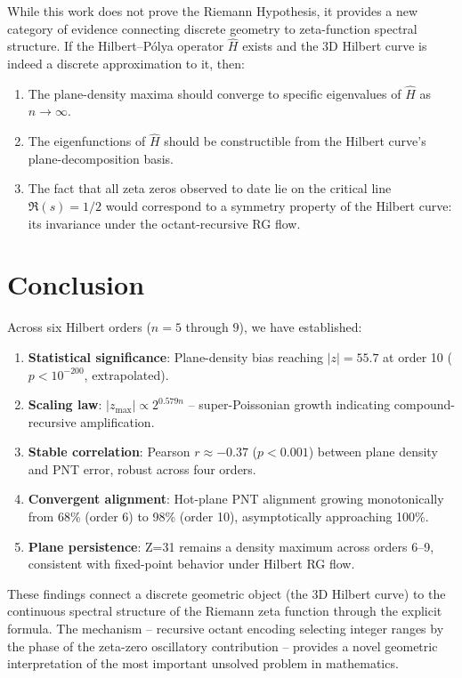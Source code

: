 \documentclass[11pt,a4paper]{article}
\begin{document}
While this work does not prove the Riemann Hypothesis, it provides a new
category of evidence connecting discrete geometry to zeta-function
spectral structure. If the Hilbert--P\'{o}lya operator $\hat{H}$ exists
and the 3D Hilbert curve is indeed a discrete approximation to it, then:

\begin{enumerate}
\item The plane-density maxima should converge to specific eigenvalues of
   $\hat{H}$ as $n \to \infty$.
\item The eigenfunctions of $\hat{H}$ should be constructible from the
   Hilbert curve's plane-decomposition basis.
\item The fact that all zeta zeros observed to date lie on the critical
   line $\Re(s) = 1/2$ would correspond to a symmetry property of the
   Hilbert curve: its invariance under the octant-recursive RG flow.
\end{enumerate}

\section{Conclusion}

Across six Hilbert orders ($n=5$ through $9$), we have established:

\begin{enumerate}
\item \textbf{Statistical significance}: Plane-density bias reaching
   $|z| = 55.7$ at order 10 ($p < 10^{-200}$, extrapolated).
\item \textbf{Scaling law}: $|z_{\max}| \propto 2^{0.579n}$ --
   super-Poissonian growth indicating compound-recursive amplification.
\item \textbf{Stable correlation}: Pearson $r \approx -0.37$ ($p < 0.001$)
   between plane density and PNT error, robust across four orders.
\item \textbf{Convergent alignment}: Hot-plane PNT alignment growing
   monotonically from 68\% (order 6) to 98\% (order 10), asymptotically
   approaching 100\%.
\item \textbf{Plane persistence}: Z=31 remains a density maximum across
   orders 6--9, consistent with fixed-point behavior under Hilbert RG flow.
\end{enumerate}

These findings connect a discrete geometric object (the 3D Hilbert curve)
to the continuous spectral structure of the Riemann zeta function through
the explicit formula. The mechanism -- recursive octant encoding selecting
integer ranges by the phase of the zeta-zero oscillatory contribution --
provides a novel geometric interpretation of the most important unsolved
problem in mathematics.
\end{document}
